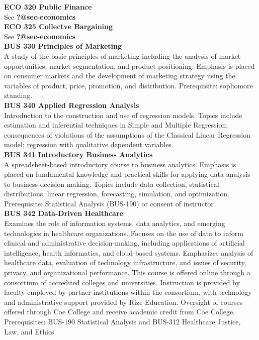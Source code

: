 \documentclass[
  letterpaper,
]{scrbook}
\begin{document}
\textbf{ECO 320 Public Finance}\\
See \textbf{?@sec-economics}\\
\textbf{ECO 325 Collectve Bargaining}\\
See \textbf{?@sec-economics}\\
\textbf{BUS 330 Principles of Marketing}\\
A study of the basic principles of marketing including the analysis of
market opportunities, market segmentation, and product positioning.
Emphasis is placed on consumer markets and the development of marketing
strategy using the variables of product, price, promotion, and
distribution. Prerequisite: sophomore standing.\\
\textbf{BUS 340 Applied Regression Analysis}\\
Introduction to the construction and use of regression models. Topics
include estimation and inferential techniques in Simple and Multiple
Regression; consequences of violations of the assumptions of the
Classical Linear Regression model; regression with qualitative dependent
variables.\\
\textbf{BUS 341 Introductory Business Analytics}\\
A spreadsheet-based introductory course to business analytics. Emphasis
is placed on fundamental knowledge and practical skills for applying
data analysis to business decision making. Topics include data
collection, statistical distributions, linear regression, forecasting,
simulation, and optimization. Prerequisite: Statistical Analysis
(BUS-190) or consent of instructor\\
\textbf{BUS 342 Data-Driven Healthcare}\\
Examines the role of information systems, data analytics, and emerging
technologies in healthcare organizations. Focuses on the use of data to
inform clinical and administrative decision-making, including
applications of artificial intelligence, health informatics, and
cloud-based systems. Emphasizes analysis of healthcare data, evaluation
of technology infrastructure, and issues of security, privacy, and
organizational performance. This course is offered online through a
consortium of accredited colleges and universities. Instruction is
provided by faculty employed by partner institutions within the
consortium, with technology and administrative support provided by Rize
Education. Oversight of courses offered through Coe College and receive
academic credit from Coe College. Prerequisites: BUS-190 Statistical
Analysis and BUS-312 Healthcare Justice, Law, and Ethics\\
\end{document}
